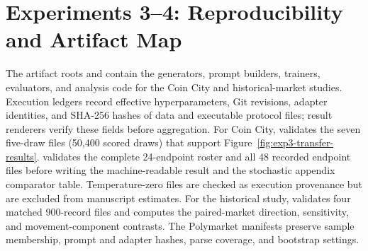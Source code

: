 

\section{Experiments 3--4: Reproducibility and Artifact Map}
\label{app:exp3-repro}

The artifact roots 
and  contain the generators, prompt builders,
trainers, evaluators, and analysis code for the Coin City and historical-market
studies. Execution ledgers record effective hyperparameters, Git revisions,
adapter identities, and SHA-256 hashes of data and executable protocol files;
result renderers verify these fields before aggregation. For Coin City,
 validates the seven five-draw files
(50,400 scored draws) that support Figure~\ref{fig:exp3-transfer-results}.
 validates the complete 24-endpoint roster and all
48 recorded endpoint files before writing the machine-readable result and the
stochastic appendix comparator table. Temperature-zero files are checked as
execution provenance but are excluded from manuscript estimates. For the
historical study,
 validates four matched 900-record files and
computes the paired-market direction, sensitivity, and movement-component
contrasts. The Polymarket manifests preserve sample membership, prompt and
adapter hashes, parse coverage, and bootstrap settings.

